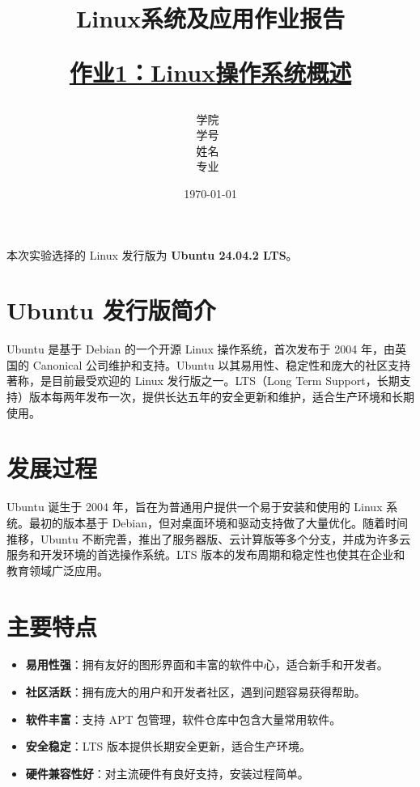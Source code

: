 \documentclass[12pt,hyperref,a4paper,UTF8]{ctexart}
\title{ 
        \vspace{1cm}
        \heiti \Huge \textbf{Linux系统及应用作业报告} \par
        \vspace{1cm} 
        \heiti \Large {\underline{作业1：Linux操作系统概述}   } 
        \vspace{3cm}
    
    }
\author{
        \vspace{0.5cm}
        \kaishu\Large 学院\ \dlmu[9cm]{卓越学院} \\ %
        \vspace{0.5cm}
        \kaishu\Large 学号\ \dlmu[9cm]{23040447} \\ %
        \vspace{0.5cm}
        \kaishu\Large 姓名\ \dlmu[9cm]{陈文轩} \qquad  \\ %
        \vspace{0.5cm}
        \kaishu\Large 专业\ \dlmu[9cm]{智能硬件与系统(电子信息工程)} \qquad \\ %
    }
\date{\today} %
\begin{document}
\cover
\thispagestyle{empty} %







\newpage
\setcounter{page}{1} %



本次实验选择的 Linux 发行版为 \textbf{Ubuntu 24.04.2 LTS}。

\section{Ubuntu 发行版简介}
Ubuntu 是基于 Debian 的一个开源 Linux 操作系统，首次发布于 2004 年，由英国的 Canonical 公司维护和支持。Ubuntu 以其易用性、稳定性和庞大的社区支持著称，是目前最受欢迎的 Linux 发行版之一。LTS（Long Term Support，长期支持）版本每两年发布一次，提供长达五年的安全更新和维护，适合生产环境和长期使用。

\section{发展过程}
Ubuntu 诞生于 2004 年，旨在为普通用户提供一个易于安装和使用的 Linux 系统。最初的版本基于 Debian，但对桌面环境和驱动支持做了大量优化。随着时间推移，Ubuntu 不断完善，推出了服务器版、云计算版等多个分支，并成为许多云服务和开发环境的首选操作系统。LTS 版本的发布周期和稳定性也使其在企业和教育领域广泛应用。

\section{主要特点}
\begin{itemize}
    \item \textbf{易用性强}：拥有友好的图形界面和丰富的软件中心，适合新手和开发者。
    \item \textbf{社区活跃}：拥有庞大的用户和开发者社区，遇到问题容易获得帮助。
    \item \textbf{软件丰富}：支持 APT 包管理，软件仓库中包含大量常用软件。
    \item \textbf{安全稳定}：LTS 版本提供长期安全更新，适合生产环境。
    \item \textbf{硬件兼容性好}：对主流硬件有良好支持，安装过程简单。
\end{itemize}
\end{document}
